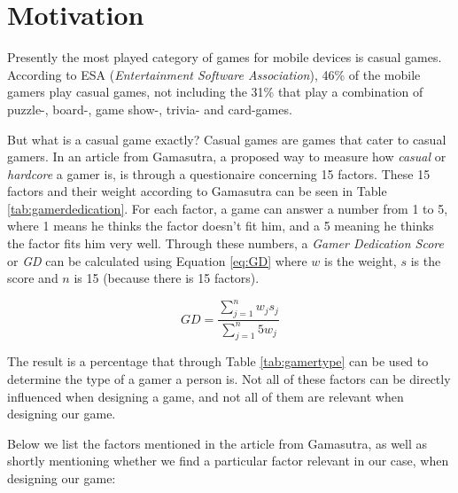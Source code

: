 \section{Motivation} \label{sec:motivation}
Presently the most played category of games for mobile devices is casual games.
According to ESA\cite{ESA}\cite{ESApdf} (\textit{Entertainment Software Association}), 46\% of the mobile gamers play casual games, not including the 31\% that play a combination of puzzle-, board-, game show-, trivia- and card-games.

But what is a casual game exactly?
Casual games are games that cater to casual gamers.
In an article from Gamasutra, a proposed way to measure how \textit{casual} or \textit{hardcore} a gamer is, is through a questionaire concerning 15 factors\cite{casual_vs_hardcore}.
These 15 factors and their weight according to Gamasutra can be seen in Table \ref{tab:gamerdedication}\cite{casual_vs_hardcore}.
For each factor, a game can answer a number from 1 to 5, where 1 means he thinks the factor doesn't fit him, and a 5 meaning he thinks the factor fits him very well.
Through these numbers, a \emph{Gamer Dedication Score} or \emph{GD} can be calculated using Equation \ref{eq:GD} where $w$ is the weight, $s$ is the score and $n$ is 15 (because there is 15 factors).

\begin{equation}\label{eq:GD}
GD = \frac{\sum\limits_{j=1}^n w_j s_j}{\sum\limits_{j=1}^n 5 w_j}
\end{equation}

The result is a percentage that through Table \ref{tab:gamertype} can be used to determine the type of a gamer a person is\cite{casual_vs_hardcore}.
Not all of these factors can be directly influenced when designing a game, and not all of them are relevant when designing our game.

Below we list the factors mentioned in the article from Gamasutra, as well as shortly mentioning whether we find a particular factor relevant in our case, when designing our game:

